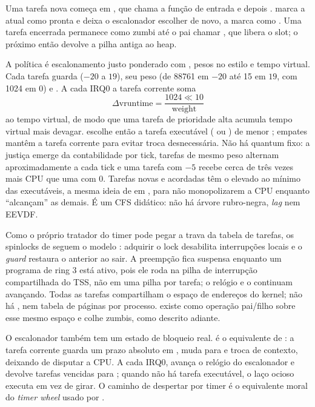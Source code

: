 Uma tarefa nova come\c{c}a em , que chama a fun\c{c}\~ao
de entrada e depois .  marca a atual como
pronta e deixa o escalonador escolher de novo,  a marca
como . Uma tarefa encerrada permanece como zumbi at\'e o pai
chamar , que libera o slot; o pr\'oximo  ent\~ao
devolve a pilha antiga ao heap.

A pol\'itica \'e escalonamento justo ponderado com , pesos no
estilo  e tempo virtual. Cada tarefa guarda
 ($-20$ a $19$), seu peso (de 88761 em $-20$ at\'e 15 em $19$,
com 1024 em $0$) e . A cada IRQ0 a tarefa corrente soma
\[
  \Delta \mathrm{vruntime} = \frac{1024 \ll 10}{\mathrm{weight}}
\]
ao tempo virtual, de modo que uma tarefa de prioridade alta acumula tempo
virtual mais devagar.  escolhe ent\~ao a tarefa execut\'avel
( ou ) de menor ; empates mant\^em a
tarefa corrente para evitar troca desnecess\'aria. N\~ao h\'a quantum fixo: a
justi\c{c}a emerge da contabilidade por tick, tarefas de mesmo peso alternam
aproximadamente a cada tick e uma tarefa com  $-5$ recebe cerca de
tr\^es vezes mais CPU que uma com  $0$. Tarefas novas e acordadas
t\^em o  elevado ao m\'inimo das execut\'aveis, a mesma ideia de
 em , para n\~ao monopolizarem a
CPU enquanto ``alcan\c{c}am'' as demais. \'E um CFS did\'atico: n\~ao h\'a
\'arvore rubro-negra, \emph{lag} nem EEVDF.

Como o pr\'oprio tratador do timer pode pegar a trava da tabela de tarefas,
os spinlocks de  seguem o modelo : adquirir o
lock desabilita interrup\c{c}\~oes locais e o \emph{guard} restaura o
 anterior ao sair. A preemp\c{c}\~ao fica suspensa enquanto um
programa de ring 3 est\'a ativo, pois ele roda na pilha de interrup\c{c}\~ao
compartilhada do TSS, n\~ao em uma pilha por tarefa; o rel\'ogio e o
 continuam avan\c{c}ando. Todas as tarefas compartilham o
espa\c{c}o de endere\c{c}os do kernel; n\~ao h\'a ,  nem
tabela de p\'aginas por processo.  existe como opera\c{c}\~ao
pai/filho sobre esse mesmo espa\c{c}o e colhe zumbis, como descrito adiante.

O escalonador tamb\'em tem um estado de bloqueio real. 
\'e o equivalente de : a tarefa corrente guarda um
prazo absoluto em , muda para  e troca de
contexto, deixando de disputar a CPU. A cada IRQ0,  avança o
rel\'ogio do escalonador e devolve tarefas vencidas para ; quando
n\~ao h\'a tarefa execut\'avel, o laço ocioso executa  em vez de
girar. O caminho de despertar por timer \'e o equivalente moral do
\emph{timer wheel} usado por .

